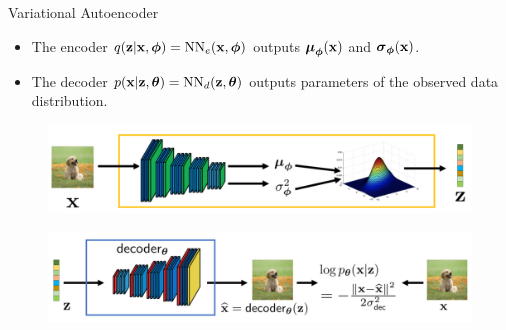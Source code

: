 \documentclass{beamer}
\begin{document}
\begin{frame}{Variational Autoencoder}
	\begin{itemize}
		\item The encoder $q(\mathbf{z} | \mathbf{x}, \boldsymbol{\phi}) = \text{NN}_e(\mathbf{x}, \boldsymbol{\phi})$ outputs $\boldsymbol{\mu}_{\boldsymbol{\phi}}(\mathbf{x})$ and $\boldsymbol{\sigma}_{\boldsymbol{\phi}}(\mathbf{x})$.
		\item The decoder $p(\mathbf{x} | \mathbf{z}, \boldsymbol{\theta}) = \text{NN}_d(\mathbf{z}, \boldsymbol{\theta})$ outputs parameters of the observed data distribution.
	\end{itemize}
	\begin{figure}[h]
		\centering
		\includegraphics[width=0.7\linewidth]{figs/vae-encoder}
	\end{figure}
	\begin{figure}[h]
		\centering
		\includegraphics[width=0.9\linewidth]{figs/vae-decoder}
	\end{figure}
\end{frame}
\end{document}
